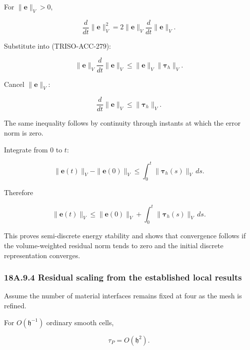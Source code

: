 \documentclass[11pt,a4paper]{article}
\begin{document}
For $\|\mathbf e\|_V>0$,

\begin{equation}
\frac{d}{dt}
\|\mathbf e\|_V^2
=
2\|\mathbf e\|_V
\frac{d}{dt}\|\mathbf e\|_V.
\tag{TRISO-ACC-280}
\label{eq:triso-acc-280}
\end{equation}

Substitute into (TRISO-ACC-279):

\begin{equation}
\|\mathbf e\|_V
\frac{d}{dt}\|\mathbf e\|_V
\le
\|\mathbf e\|_V
\|\boldsymbol\tau_h\|_V.
\tag{TRISO-ACC-281}
\label{eq:triso-acc-281}
\end{equation}

Cancel $\|\mathbf e\|_V$:

\begin{equation}
\boxed{
\frac{d}{dt}\|\mathbf e\|_V
\le
\|\boldsymbol\tau_h\|_V.
}
\tag{TRISO-ACC-282}
\label{eq:triso-acc-282}
\end{equation}

The same inequality follows by continuity through instants at which the error norm is zero.

Integrate from $0$ to $t$:

\begin{equation}
\|\mathbf e(t)\|_V-\|\mathbf e(0)\|_V
\le
\int_0^t
\|\boldsymbol\tau_h(s)\|_V\,ds.
\tag{TRISO-ACC-283}
\label{eq:triso-acc-283}
\end{equation}

Therefore

\begin{equation}
\boxed{
\|\mathbf e(t)\|_V
\le
\|\mathbf e(0)\|_V
+
\int_0^t
\|\boldsymbol\tau_h(s)\|_V\,ds.
}
\tag{TRISO-ACC-284}
\label{eq:triso-acc-284}
\end{equation}

This proves semi-discrete energy stability and shows that convergence follows if the volume-weighted residual norm tends to zero and the initial discrete representation converges.

\subsubsection*{18A.9.4 Residual scaling from the established local results}

Assume the number of material interfaces remains fixed at four as the mesh is refined.

For $O(\mathfrak h^{-1})$ ordinary smooth cells,

\begin{equation}
\tau_P=O(\mathfrak h^2).
\tag{TRISO-ACC-285}
\label{eq:triso-acc-285}
\end{equation}
\end{document}
